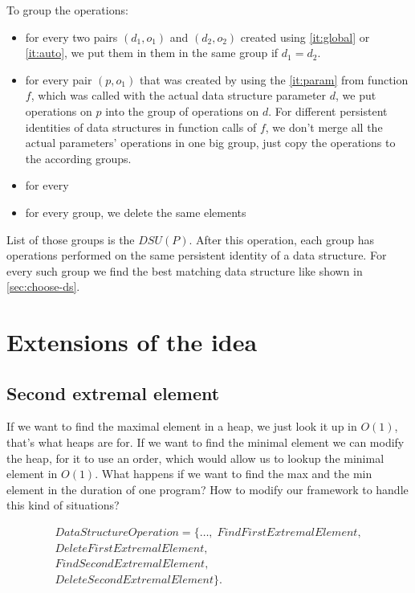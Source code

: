 \documentclass[a4paper,11pt]{article}
\begin{document}
		To group the operations:
		\begin{itemize}

			\item for every two pairs $(d_1, o_1)$ and $(d_2, o_2)$ created using \autoref{it:global} or
				\autoref{it:auto}, we put them in them in the same group
				if $d_1 = d_2$.

			\item for every pair $(p, o_1)$ that was created by using the \autoref{it:param} from function
				$f$, which was called with the actual data structure parameter $d$, we put operations
				on $p$ into the group of operations on $d$. For different persistent identities of data
				structures in function calls of $f$, we don't merge all the actual parameters'
				operations in one big group, just copy the operations to the according
				groups.

			\item for every 

			\item for every group, we delete the same elements

		\end{itemize}

		List of those groups is the $DSU(P)$. After this operation, each group has operations performed on the
		same persistent identity of a data structure. For every such group we find the best matching data
		structure like shown in \autoref{sec:choose-ds}.


\pagebreak

\section{Extensions of the idea}

	\subsection{Second extremal element}

		If we want to find the maximal element in a heap, we just look it up in $O(1)$, that's what heaps are
		for.  If we want to find the minimal element we can modify the heap, for it to use an order, which would
		allow us to lookup the minimal element in $O(1)$.  What happens if we want to find the max and the min
		element in the duration of one program?  How to modify our framework to handle this kind of situations?

		\begin{eqnarray*}
			DataStructureOperation = \{\dots, \; FindFirstExtremalElement,\\
			DeleteFirstExtremalElement,\\
			FindSecondExtremalElement,\\
			DeleteSecondExtremalElement\}.
		\end{eqnarray*}
\end{document}
